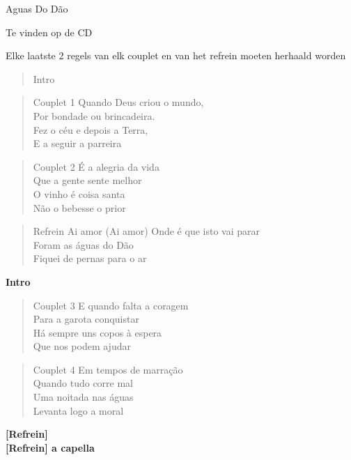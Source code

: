 \begin{song}{Aguas Do Dão}
\begin{center}
Te vinden op de CD
\end{center}
Elke laatste 2 regels van elk couplet en van het refrein moeten herhaald worden\\
\begin{verse}{Intro}

\end{verse}

\begin{verse}{Couplet 1}
Quando Deus criou o mundo,\\ 		         
Por bondade ou brincadeira.\\
Fez o céu e depois a Terra,\\ 
E a seguir a parreira\\
\end{verse}

\begin{verse}{Couplet 2}
É a alegria da vida\\ 		        
Que a gente sente melhor\\           
O vinho é coisa santa\\
Não o bebesse o prior\\
\end{verse}

\begin{verse}{Refrein}
Ai amor (Ai amor) Onde é que isto vai parar \\
Foram as águas do Dão\\
Fiquei de pernas para o ar\\ 
\end{verse}

\textbf{Intro}\\

\begin{verse}{Couplet 3}
E quando falta a coragem\\ 
Para a garota conquistar \\
Há sempre uns copos à espera\\ 
Que nos podem ajudar\\
\end{verse}

\begin{verse}{Couplet 4}
Em tempos de marração\\ 
Quando tudo corre mal \\
Uma noitada nas águas \\
Levanta logo a moral \\
\end{verse}

\textbf{[Refrein]}\\
\textbf{[Refrein] a capella}\\

\end{song}